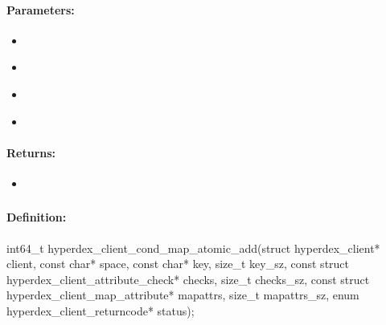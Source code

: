 \paragraph{Parameters:}
\begin{itemize}[noitemsep]
\item {}\\

\item {}\\

\item {}\\

\item {}\\

\end{itemize}

\paragraph{Returns:}
\begin{itemize}[noitemsep]
\item {}\\

\end{itemize}

\pagebreak
\subsubsection{}
\label{api:c:cond_map_atomic_add}


\paragraph{Definition:}
\begin{ccode}
int64_t hyperdex_client_cond_map_atomic_add(struct hyperdex_client* client,
        const char* space,
        const char* key, size_t key_sz,
        const struct hyperdex_client_attribute_check* checks, size_t checks_sz,
        const struct hyperdex_client_map_attribute* mapattrs, size_t mapattrs_sz,
        enum hyperdex_client_returncode* status);
\end{ccode}

